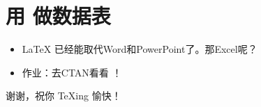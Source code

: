 \documentclass{beamer}
\begin{document}
\section{用 \protect{} 做数据表}

\begin{frame}[fragile]{\insertsection}
\begin{itemize}
\item \LaTeX{} 已经能取代Word和PowerPoint了。那Excel呢？
\item 作业：去CTAN看看 ！
\end{itemize}
\end{frame}

\begin{frame}
\begin{center}
谢谢，祝你 \TeX{}ing 愉快！
\end{center}
\end{frame}
\end{document}
